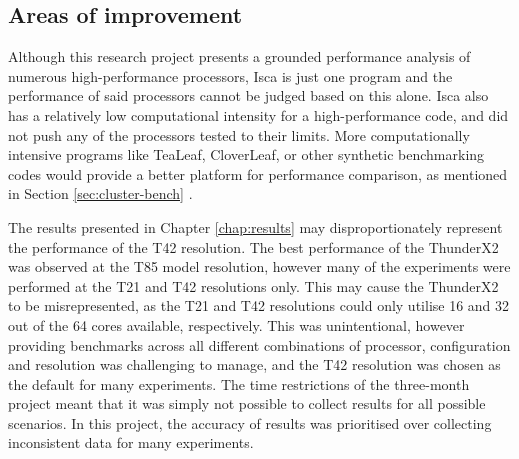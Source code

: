 \documentclass[a4paper,11pt]{report}
\begin{document}
\subsection{Areas of improvement}
Although this research project presents a grounded performance analysis of numerous high-performance processors, Isca is just one program and the performance of said processors cannot be judged based on this alone. Isca also has a relatively low computational intensity for a high-performance code, and did not push any of the processors tested to their limits. More computationally intensive programs like TeaLeaf, CloverLeaf, or other synthetic benchmarking codes would provide a better platform for performance comparison, as mentioned in Section \ref{sec:cluster-bench} \cite{mcintosh2017tealeaf, mallinson2013cloverleaf}.
\par
The results presented in Chapter \ref{chap:results} may disproportionately represent the performance of the T42 resolution. The best performance of the ThunderX2 was observed at the T85 model resolution, however many of the experiments were performed at the T21 and T42 resolutions only. This may cause the ThunderX2 to be misrepresented, as the T21 and T42 resolutions could only utilise 16 and 32 out of the 64 cores available, respectively. This was unintentional, however providing benchmarks across all different combinations of processor, configuration and resolution was challenging to manage, and the T42 resolution was chosen as the default for many experiments. The time restrictions of the three-month project meant that it was simply not possible to collect results for all possible scenarios. In this project, the accuracy of results was prioritised over collecting inconsistent data for many experiments. 

\end{document}
